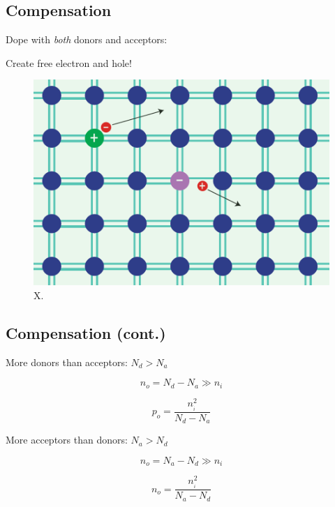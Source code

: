  




\subsection{Compensation}


 Dope with \textit{both} donors and acceptors:
  
    Create free electron and hole!
 




\begin{figure}
\begin{center}
\includegraphics[width=.5\columnwidth]{silicon_dopant_both}
\end{center}
\caption{X. } \label{fig:silicon_dopant_both}
\end{figure}




\subsection{Compensation (cont.)}


 More donors than acceptors:   $N_d > N_a$


\begin{equation}
	{n_o} = {N_d} - {N_a} \gg {n_i}
\end{equation}


\begin{equation}
	{p_o} = \frac{{n_{_i}^2}}{{{N_d} - {N_a}}}
\end{equation}

 More acceptors than donors:  $N_a > N_d$


\begin{equation}
	{n_o} = {N_a} - {N_d} \gg {n_i}
\end{equation}


\begin{equation}
	{n_o} = \frac{{n_{_i}^2}}{{{N_a} - {N_d}}}
\end{equation}








